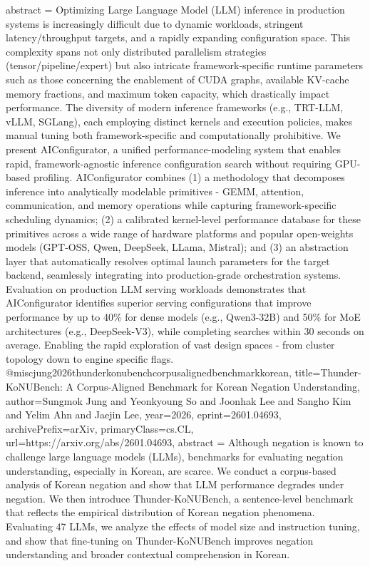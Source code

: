{      abstract = {Optimizing Large Language Model (LLM) inference in production systems is increasingly difficult due to dynamic workloads, stringent latency/throughput targets, and a rapidly expanding configuration space. This complexity spans not only distributed parallelism strategies (tensor/pipeline/expert) but also intricate framework-specific runtime parameters such as those concerning the enablement of CUDA graphs, available KV-cache memory fractions, and maximum token capacity, which drastically impact performance. The diversity of modern inference frameworks (e.g., TRT-LLM, vLLM, SGLang), each employing distinct kernels and execution policies, makes manual tuning both framework-specific and computationally prohibitive. We present AIConfigurator, a unified performance-modeling system that enables rapid, framework-agnostic inference configuration search without requiring GPU-based profiling. AIConfigurator combines (1) a methodology that decomposes inference into analytically modelable primitives - GEMM, attention, communication, and memory operations while capturing framework-specific scheduling dynamics; (2) a calibrated kernel-level performance database for these primitives across a wide range of hardware platforms and popular open-weights models (GPT-OSS, Qwen, DeepSeek, LLama, Mistral); and (3) an abstraction layer that automatically resolves optimal launch parameters for the target backend, seamlessly integrating into production-grade orchestration systems. Evaluation on production LLM serving workloads demonstrates that AIConfigurator identifies superior serving configurations that improve performance by up to 40\% for dense models (e.g., Qwen3-32B) and 50\% for MoE architectures (e.g., DeepSeek-V3), while completing searches within 30 seconds on average. Enabling the rapid exploration of vast design spaces - from cluster topology down to engine specific flags.}
}@misc{jung2026thunderkonubenchcorpusalignedbenchmarkkorean,
      title={Thunder-KoNUBench: A Corpus-Aligned Benchmark for Korean Negation Understanding}, 
      author={Sungmok Jung and Yeonkyoung So and Joonhak Lee and Sangho Kim and Yelim Ahn and Jaejin Lee},
      year={2026},
      eprint={2601.04693},
      archivePrefix={arXiv},
      primaryClass={cs.CL},
      url={https://arxiv.org/abs/2601.04693},
      abstract = {Although negation is known to challenge large language models (LLMs), benchmarks for evaluating negation understanding, especially in Korean, are scarce. We conduct a corpus-based analysis of Korean negation and show that LLM performance degrades under negation. We then introduce Thunder-KoNUBench, a sentence-level benchmark that reflects the empirical distribution of Korean negation phenomena. Evaluating 47 LLMs, we analyze the effects of model size and instruction tuning, and show that fine-tuning on Thunder-KoNUBench improves negation understanding and broader contextual comprehension in Korean.}
}
